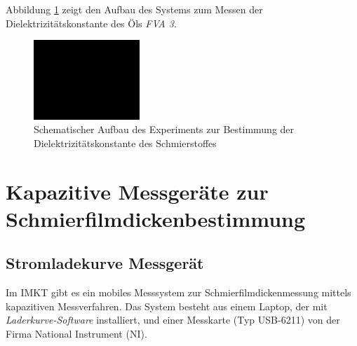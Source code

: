 Abbildung \ref{fig:aufbau_zur_bestimmung_der_dielektrizitaetskonstante} zeigt den Aufbau des Systems zum Messen der Dielektrizitätskonstante des Öls \textit{FVA 3}.
\begin{figure}[htb]
    \centering
    \includegraphics[width=4cm]{./images/blank_img.jpg}
    \caption{Schematischer Aufbau des Experiments zur Bestimmung der Dielektrizitätskonstante des Schmierstoffes}
    \label{fig:aufbau_zur_bestimmung_der_dielektrizitaetskonstante}
\end{figure}


\section{Kapazitive Messgeräte zur Schmierfilmdickenbestimmung}
\label{sec:kapazitive_messgeraete_zur_schmierfilmdickenbestimmung}

\subsection{Stromladekurve Messgerät}
\label{sub:stromladekurve_messgeraet}

Im IMKT gibt es ein mobiles Messsystem zur Schmierfilmdickenmessung mittels kapazitiven Messverfahren.
Das System besteht aus einem Laptop, der mit \textit{Laderkurve-Software} installiert, und einer Messkarte (Typ USB-6211) von der Firma National Instrument (NI).

